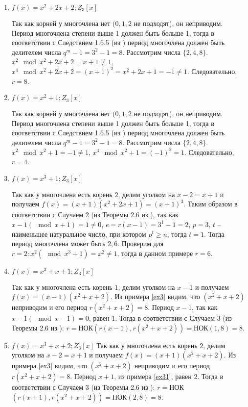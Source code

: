 \documentclass[utf8x, 14pt]{G7-32} %
\begin{document}
\begin{enumerate}
    \item $f(x)=x^2+2x+2; Z_3[x]$
    
    Так как корней у многочлена нет ($0,1,2$ не подходят), он неприводим. Период многочлена степени выше 1 должен быть больше 1, тогда в соответствии с Следствием 1.6.5 (из \cite{hse:Teoria_Gener}) период многочлена должен быть делителем числа $q^m -1 = 3^2 -1 = 8$. Рассмотрим числа $\{2, 4, 8\}$. $x^2 \mod x^2 + 2x +2 = x +1 \neq 1$,  $x^4 \mod x^2 + 2x +2 = (x +1)^2 = x^2 + 2x + 1 = - 1 \neq 1$. Следовательно, $r=8$.

    \item $f(x)=x^2+1; Z_3[x]$
    
    Так как корней у многочлена нет ($0,1,2$ не подходят), он неприводим. Период многочлена степени выше 1 должен быть больше 1, тогда в соответствии с Следствием 1.6.5 (из \cite{hse:Teoria_Gener}) период многочлена должен быть делителем числа $q^m -1 = 3^2 -1 = 8$. Рассмотрим числа $\{2, 4, 8\}$. $x^2 \mod x^2 + 1 = -1 \neq 1$,  $x^4 \mod x^2 + 1 = (-1)^2 = 1$. Следовательно, $r=4$.

    \item $f(x)=x^3+1; Z_3[x]$
    
    Так как у многочлена есть корень $2$, делим уголком на $x-2 = x+1$ и получаем $f(x) = (x+1) (x^2 + 2x +1) = (x+1)^3$. Таким образом в соответствии с Случаем 2 (из Теоремы 2.6 из \cite{hse:Teoria_Gener}), так как $x - 1 (\mod{x + 1}) = 1 \neq 0$, $e = r(x-1) = 3^1 - 1 = 2$, $p = 3$, $t$ – наименьшее натуральное число, при котором $p^t\geq n$, тогда $t = 1$. Тогда период многочлена может быть ${2, 6}$. Проверим для $r = 2: x^2 (\mod x^3 + 1) = x^2 \neq 1$, тогда в данном примере $r = 6$.

    \item $f(x)=x^3+x+1; Z_3[x]$
    
    Так как у многочлена есть корень $1$, делим уголком на $x-1$ и получаем $f(x) = (x-1) (x^2 + x +2)$. Из примера \ref{ex3} видим, что $(x^2 + x +2)$ неприводим и его период $r(x^2 + x +2) = 8$. Период $x -1$, так как $x -1 (\mod{x - 1}) = 0$, равен $1$. Тогда в соответствии с Случаем 3 (из Теоремы 2.6 из \cite{hse:Teoria_Gener}): $r =$НОК$(r(x-1), r(x^2 + x +2)) = $НОК$(1, 8) = 8$.
    

    \item $f(x)=x^3+x+2; Z_3[x]$
    Так как у многочлена есть корень $2$, делим уголком на $x-2 = x+1$ и получаем $f(x) = (x+1) (x^2 + x +2)$. Из примера \ref{ex3} видим, что $(x^2 + x +2)$ неприводим и его период $r(x^2 + x +2) = 8$. Период $x + 1$, из примера \ref{ex31}, равен $2$. Тогда в соответствии с Случаем 3 (из Теоремы 2.6 из \cite{hse:Teoria_Gener}): $r =$НОК$(r(x+1), r(x^2 + x +2)) = $НОК$(2, 8) = 8$.
    
\end{enumerate}
\end{document}
